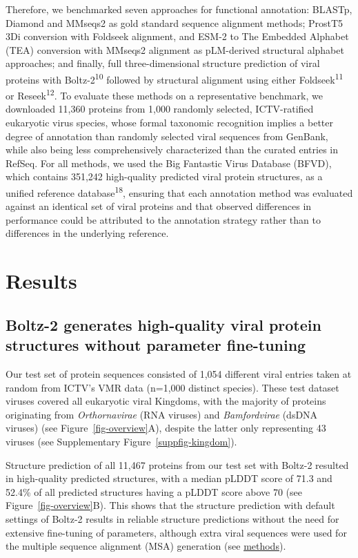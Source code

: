 \documentclass[
  sn-nature,
]{sn-jnl}
\begin{document}
Therefore, we benchmarked seven approaches for functional annotation:
BLASTp, Diamond and MMseqs2 as gold standard sequence alignment methods;
ProstT5 3Di conversion with Foldseek alignment, and ESM-2 to The
Embedded Alphabet (TEA) conversion with MMseqs2 alignment as pLM-derived
structural alphabet approaches; and finally, full three-dimensional
structure prediction of viral proteins with Boltz-2\textsuperscript{10}
followed by structural alignment using either
Foldseek\textsuperscript{11} or Reseek\textsuperscript{12}. To evaluate
these methods on a representative benchmark, we downloaded 11,360
proteins from 1,000 randomly selected, ICTV-ratified eukaryotic virus
species, whose formal taxonomic recognition implies a better degree of
annotation than randomly selected viral sequences from GenBank, while
also being less comprehensively characterized than the curated entries
in RefSeq. For all methods, we used the Big Fantastic Virus Database
(BFVD), which contains 351,242 high-quality predicted viral protein
structures, as a unified reference database\textsuperscript{18},
ensuring that each annotation method was evaluated against an identical
set of viral proteins and that observed differences in performance could
be attributed to the annotation strategy rather than to differences in
the underlying reference.

\section{Results}\label{results}

\subsection{Boltz-2 generates high-quality viral protein structures
without parameter
fine-tuning}\label{boltz-2-generates-high-quality-viral-protein-structures-without-parameter-fine-tuning}

Our test set of protein sequences consisted of 1,054 different viral
entries taken at random from ICTV's VMR data (n=1,000 distinct species).
These test dataset viruses covered all eukaryotic viral Kingdoms, with
the majority of proteins originating from \emph{Orthornavirae} (RNA
viruses) and \emph{Bamfordvirae} (dsDNA viruses) (see
Figure~\ref{fig-overview}A), despite the latter only representing 43
viruses (see Supplementary Figure~\ref{suppfig-kingdom}).

Structure prediction of all 11,467 proteins from our test set with
Boltz-2 resulted in high-quality predicted structures, with a median
pLDDT score of 71.3 and 52.4\% of all predicted structures having a
pLDDT score above 70 (see Figure~\ref{fig-overview}B). This shows that
the structure prediction with default settings of Boltz-2 results in
reliable structure predictions without the need for extensive
fine-tuning of parameters, although extra viral sequences were used for
the multiple sequence alignment (MSA) generation (see
\hyperref[structure-prediction]{methods}).
\end{document}
